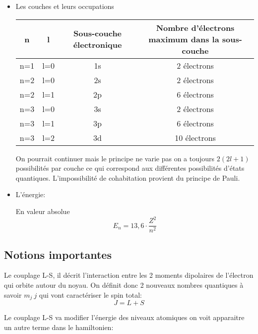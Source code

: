 \begin{itemize}[label=]

	\item Les couches et leurs occupations 


	\begin{tabular}{|c|c|c|c|}

		\hline
		n & l & Sous-couche électronique & Nombre d'électrons maximum dans la sous-couche \\

		\hline
		n=1 & l=0 & 1s & 2 électrons \\

		\hline
		n=2 & l=0 & 2s & 2 électrons \\

		\hline
		n=2 & l=1 & 2p & 6 électrons \\

		\hline
		n=3 & l=0 & 3s & 2 électrons \\

		\hline
		n=3 & l=1 & 3p & 6 électrons \\

		\hline
		n=3 & l=2 & 3d & 10 électrons \\
		\hline

	\end{tabular}
	 
	\vspace{12pt}

	On pourrait continuer mais le principe ne varie pas on a toujours $2(2l+1)$ possibilités par couche ce qui correspond aux différentes possibilités d'états quantiques. L'impossibilité de cohabitation provient du principe de Pauli.

	\item L'énergie: 

	En valeur absolue
	\[
		E_n= 13,6\cdot\frac{Z^2}{n^2}
	\]

\end{itemize}


\subsection{Notions importantes}


Le couplage L-S, il décrit l'interaction entre les 2 moments dipolaires de l'électron qui orbite autour du noyau. On définit donc 2 nouveaux nombres quantiques à savoir $m_j \ j$ qui vont caractériser le spin total:
\[
	J=L+S
\]

Le couplage L-S va modifier l'énergie des niveaux atomiques on voit apparaitre un autre terme dans le hamiltonien:

